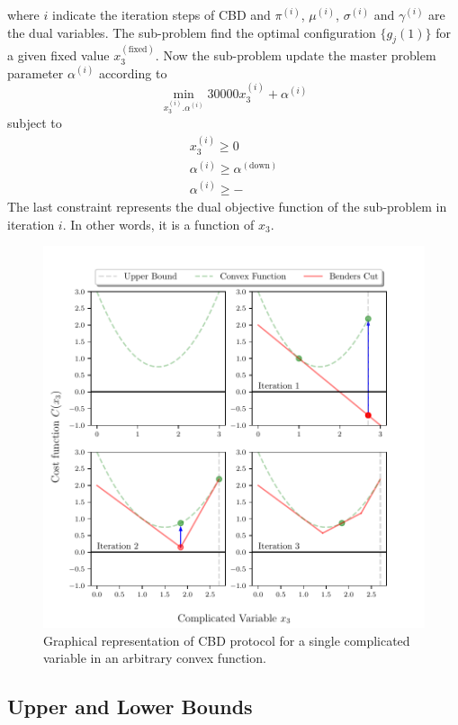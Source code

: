 where $i$ indicate the iteration steps of CBD and $\pi^{(i)}$, $\mu^{(i)}$, $\sigma^{(i)}$ and $\gamma^{(i)}$ are the dual variables. The sub-problem find the optimal configuration $\{g_{j}(1)\}$ for a given fixed value $x_{3}^{(\text{fixed})}$.
Now the sub-problem update the master problem parameter $\alpha^{(i)}$ according to
\begin{equation}
    \min_{x_{3}^{(i)}. \alpha^{(i)}} 30000x_{3}^{(i)} + \alpha^{(i)}
\end{equation}
subject to
\begin{align}
    x_{3}^{(i)} \geq 0 \\
    \alpha^{(i)} \geq \alpha^{(\text{down})}\\
    \alpha^{(i)} \geq -\
\end{align}
The last constraint represents the dual objective function of the sub-problem in iteration $i$. In other words, it is a function of $x_{3}$.
\begin{figure}[H]
\centering
\includegraphics[width=\textwidth]{Figures/BenderIlustration.pdf} 
\caption{Graphical representation of CBD protocol for a single complicated variable in an arbitrary convex function.}
\label{fig:BDIlustration}
\end{figure}
\subsection{Upper and Lower Bounds}
